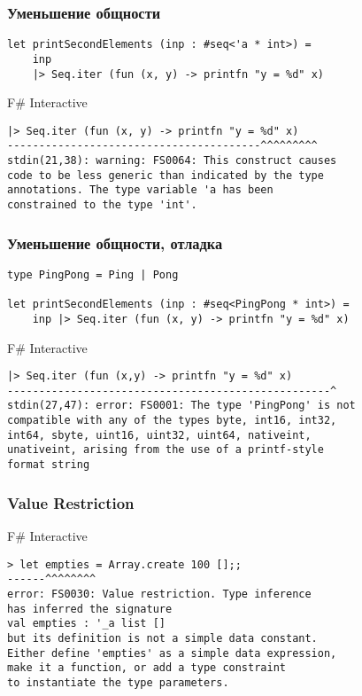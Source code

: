 \documentclass[xetex,mathserif,serif]{beamer}
\begin{document}
	\begin{frame}[fragile]
		\frametitle{Уменьшение общности}
		\begin{verbatim}
let printSecondElements (inp : #seq<'a * int>) =
    inp
    |> Seq.iter (fun (x, y) -> printfn "y = %d" x)
		\end{verbatim}

		\begin{alertblock}{F\# Interactive}
			\begin{verbatim}
|> Seq.iter (fun (x, y) -> printfn "y = %d" x)
----------------------------------------^^^^^^^^^
stdin(21,38): warning: FS0064: This construct causes 
code to be less generic than indicated by the type 
annotations. The type variable 'a has been 
constrained to the type 'int'.
			\end{verbatim}
		\end{alertblock}
\end{frame}

	\begin{frame}[fragile]
		\frametitle{Уменьшение общности, отладка}
		\begin{verbatim}
type PingPong = Ping | Pong

let printSecondElements (inp : #seq<PingPong * int>) =
    inp |> Seq.iter (fun (x, y) -> printfn "y = %d" x)
		\end{verbatim}

		\begin{alertblock}{F\# Interactive}
			\begin{verbatim}
|> Seq.iter (fun (x,y) -> printfn "y = %d" x)
---------------------------------------------------^
stdin(27,47): error: FS0001: The type 'PingPong' is not 
compatible with any of the types byte, int16, int32, 
int64, sbyte, uint16, uint32, uint64, nativeint, 
unativeint, arising from the use of a printf-style 
format string
			\end{verbatim}
		\end{alertblock}
\end{frame}

	\begin{frame}[fragile]
		\frametitle{Value Restriction}
		\begin{alertblock}{F\# Interactive}
			\begin{verbatim}
> let empties = Array.create 100 [];;
------^^^^^^^^
error: FS0030: Value restriction. Type inference 
has inferred the signature 
val empties : '_a list []
but its definition is not a simple data constant. 
Either define 'empties' as a simple data expression, 
make it a function, or add a type constraint 
to instantiate the type parameters.
			\end{verbatim}
		\end{alertblock}
\end{frame}
\end{document}
